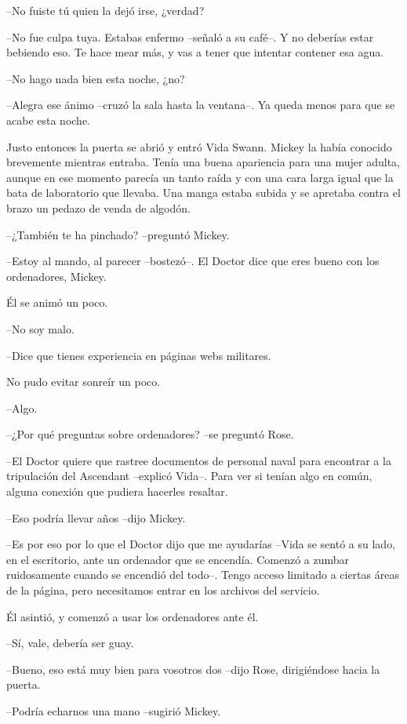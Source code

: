 {--No fuiste tú quien la dejó irse, ¿verdad?}

{--No fue culpa tuya. Estabas enfermo --señaló a su café--. Y no
 deberías estar bebiendo eso. Te hace mear más, y vas a tener que
intentar contener esa agua.}

{--No hago nada bien esta noche, ¿no?}

{--Alegra ese ánimo --cruzó la sala hasta la ventana--. Ya queda menos
para que se acabe esta noche.}

{Justo entonces la puerta se abrió y entró Vida Swann. Mickey la había
 conocido brevemente mientras entraba. Tenía una buena apariencia para
 una mujer adulta, aunque en ese momento parecía un tanto raída y con una
 cara larga igual que la bata de laboratorio que llevaba. Una manga
 estaba subida y se apretaba contra el brazo un pedazo de venda de
algodón.}

{--¿También te ha pinchado? --preguntó Mickey.}

{--Estoy al mando, al parecer --bostezó--. El Doctor dice que eres bueno
con los ordenadores, Mickey.}

{Él se animó un poco.}

{--No soy malo.}

{--Dice que tienes experiencia en páginas webs militares.}

{No pudo evitar sonreír un poco.}

{--Algo.}

{--¿Por qué preguntas sobre ordenadores? --se preguntó Rose.}

{--El Doctor quiere que rastree documentos de personal naval para
 encontrar a la tripulación del Ascendant --explicó Vida--. Para ver si
tenían algo en común, alguna conexión que pudiera hacerles resaltar.}

{--Eso podría llevar años --dijo Mickey.}

{--Es por eso por lo que el Doctor dijo que me ayudarías --Vida se sentó
 a su lado, en el escritorio, ante un ordenador que se encendía. Comenzó
 a zumbar ruidosamente cuando se encendió del todo--. Tengo acceso
 limitado a ciertas áreas de la página, pero necesitamos entrar en los
archivos del servicio.}

{Él asintió, y comenzó a usar los ordenadores ante él.}

{--Sí, vale, debería ser guay.}

{--Bueno, eso está muy bien para vosotros dos --dijo Rose, dirigiéndose
hacia la puerta.}

{--Podría echarnos una mano --sugirió Mickey.}

